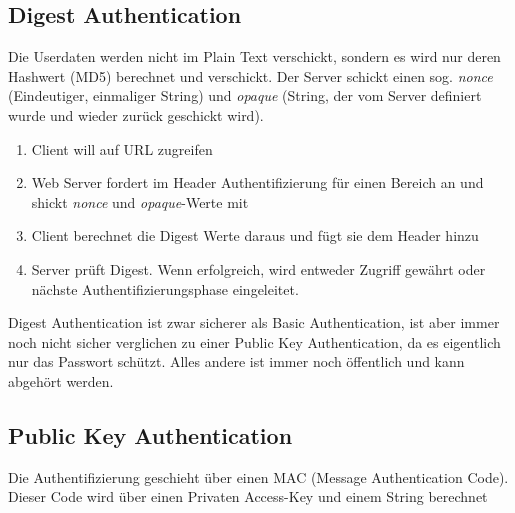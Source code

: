 \documentclass[a4paper, 11pt]{article}
\begin{document}
\subsection{Digest Authentication}
Die Userdaten werden nicht im Plain Text verschickt, sondern es wird nur deren Hashwert (MD5) berechnet und verschickt. Der Server schickt einen sog. \textit{nonce} (Eindeutiger, einmaliger String) und \textit{opaque} (String, der vom Server definiert wurde und wieder zurück geschickt wird).
\begin{enumerate}
	\item Client will auf URL zugreifen
	\item Web Server fordert im Header Authentifizierung für einen Bereich an und shickt \textit{nonce} und \textit{opaque}-Werte mit
	\item Client berechnet die Digest Werte daraus und fügt sie dem Header hinzu
	\item Server prüft Digest. Wenn erfolgreich, wird entweder Zugriff gewährt oder nächste Authentifizierungsphase eingeleitet.
\end{enumerate}

Digest Authentication ist zwar sicherer als Basic Authentication, ist aber immer noch nicht sicher verglichen zu einer Public Key Authentication, da es eigentlich nur das Passwort schützt. Alles andere ist immer noch öffentlich und kann abgehört werden.

\newpage

\subsection{Public Key Authentication}
Die Authentifizierung geschieht über einen MAC (Message Authentication Code). Dieser Code wird über einen Privaten Access-Key und einem String berechnet
\end{document}
